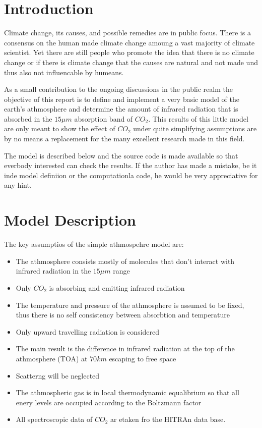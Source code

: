 \section{Introduction}

Climate change, its causes, and possible remedies are in public focus. There is a consensus on the human made climate change amoung a vast majority of climate scientist. Yet there are still people who promote the idea that there is no climate change or if there is climate change that the causes are natural and not made und thus also not influencable by humeans. 

As a small contribution to the ongoing discussions in the public realm the objective of this report is to define and implement a very basic model of the earth's athmosphere and determine the amount of infrared radiation that is absorbed in the $15 \mu m$ absorption band of $CO_2$. This results of this little model are only meant to show the effect of $CO_2$ under quite simplifying assumptions are by no means a replacement for the many excellent research made in this field.    

The model is described below and the source code is made available so that everbody interested can check the results. If the author has made a mistake, be it inde model definiion or the computationla code, he would be very appreciative for any hint.


\section{Model Description}

The key assumptios of the simple athmospehre model are:
\begin{itemize}
	\item The athmosphere consists mostly of molecules that don't interact with infrared radiation in the $15 \mu m$ range
	\item Only $CO_2$ is absorbing and emitting infrared radiation
	\item The temperature and pressure of the athmosphere is assumed to be fixed, thus there is no self consistency between absorbtion and temperature
	\item Only upward travelling radiation is considered  
	\item The main result is the difference in infrared radiation at the top of the athmosphere (TOA) at $70 km$ escaping to free space 
	\item Scatterng will be neglected
	\item The athmospheric  gas is in local thermodynamic equalibrium so that all enery levels are occupied according to 
	the Boltzmann factor
	\item All spectroscopic data of $CO_2$ ar etaken fro the HITRAn data base. 
\end{itemize}


